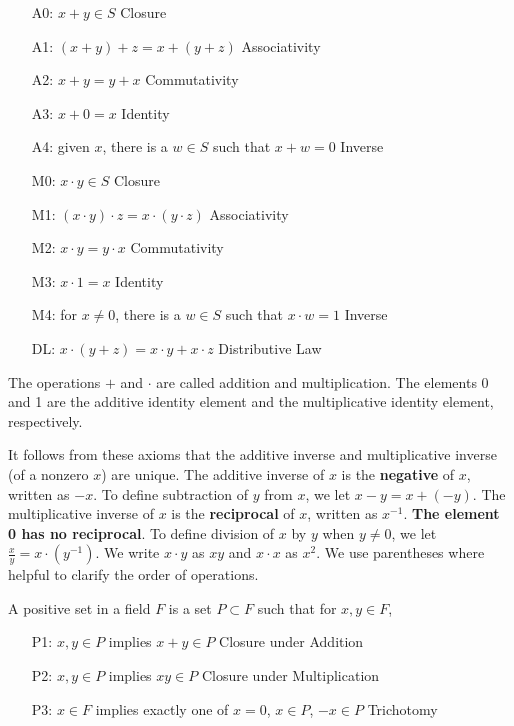 \documentclass[
	12pt, %
	fleqn, %
	a4paper, %
]{LegrandOrangeBook}
\begin{document}
\begin{enumerate}
\begin{definition}
\begin{itemize}
  \item[A0:] \( x + y \in S \) \hfill Closure
  \item[A1:] \( (x + y) + z = x + (y + z) \) \hfill Associativity
  \item[A2:] \( x + y = y + x \) \hfill Commutativity
  \item[A3:] \( x + 0 = x \) \hfill Identity
  \item[A4:] given \( x \), there is a \( w \in S \) such that \( x + w = 0 \) \hfill Inverse
  \item[M0:] \( x \cdot y \in S \) \hfill Closure
  \item[M1:] \( (x \cdot y) \cdot z = x \cdot (y \cdot z) \) \hfill Associativity
  \item[M2:] \( x \cdot y = y \cdot x \) \hfill Commutativity
  \item[M3:] \( x \cdot 1 = x \) \hfill Identity
  \item[M4:] for \( x \neq 0 \), there is a \( w \in S \) such that \( x \cdot w = 1 \) \hfill Inverse
  \item[DL:] \( x \cdot (y + z) = x \cdot y + x \cdot z \) \hfill Distributive Law
\end{itemize}

\end{definition}
The operations \( + \) and \( \cdot \) are called addition and multiplication. The elements 0 and 1 are the additive identity element and the multiplicative identity element, respectively.   


It follows from these axioms that the additive inverse and multiplicative inverse (of a nonzero \( x \)) are unique. The additive inverse of \( x \) is the \textbf{negative} of \( x \), written as \( -x \). To define subtraction of \( y \) from \( x \), we let \( x - y = x + (-y) \). The multiplicative inverse of \( x \) is the \textbf{reciprocal} of \( x \), written as \( x^{-1} \). \textbf{The element 0 has no reciprocal}. To define division of \( x \) by \( y \) when \( y \neq 0 \), we let \( \frac{x}{y} = x \cdot (y^{-1}) \). We write \( x \cdot y \) as \( xy \) and \( x \cdot x \) as \( x^2 \). We use parentheses where helpful to clarify the order of operations.

\begin{definition}\label{axi:order}
     A positive set in a field \( F \) is a set \( P \subset F \) such that for \( x, y \in F \),

\begin{itemize}
  \item[P1:] \( x, y \in P \) implies \( x + y \in P \) \hfill Closure under Addition
  \item[P2:] \( x, y \in P \) implies \( xy \in P \) \hfill Closure under Multiplication
  \item[P3:] \( x \in F \) implies exactly one of \( x = 0 \), \( x \in P \), \( -x \in P \) \hfill Trichotomy
\end{itemize}


\end{definition}
\end{enumerate}
\end{document}
